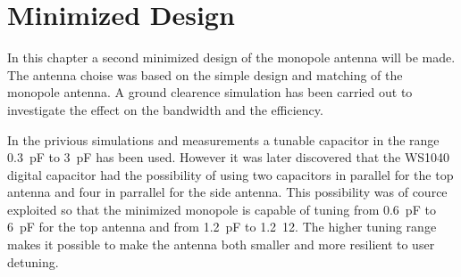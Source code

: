\chapter{Minimized Design}
\label{cha_intro_5mm}
In this chapter a second minimized design of the monopole antenna will be made.
The antenna choise was based on the simple design and matching of the monopole antenna.
A ground clearence simulation has been carried out to investigate the effect on the bandwidth and the efficiency.

In the privious simulations and measurements a tunable capacitor in the range \SI{0.3}{pF} to \SI{3}{pF} has been used. However it was later discovered that the WS1040 digital capacitor had the possibility of using two capacitors in parallel for the top antenna and four in parrallel for the side antenna. This possibility was of cource exploited so that the minimized monopole is capable of tuning from \SI{0.6}{pF} to \SI{6}{pF} for the top antenna and from \SI{1.2}{pF} to \SI{1.2}{12}. The higher tuning range makes it possible to make the antenna both smaller and more resilient to user detuning.
